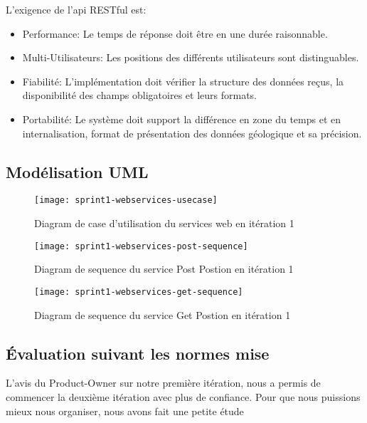 L'exigence de l'api RESTful est:
\begin{itemize}
    \item Performance: Le temps de réponse doit être en une durée raisonnable.
    \item Multi-Utilisateurs: Les positions des différents utilisateurs sont
        distinguables.
    \item Fiabilité: L'implémentation doit vérifier la structure des données
        reçus, la disponibilité des champs obligatoires et leurs formats.
    \item Portabilité: Le système doit support la différence en zone du temps
        et en internalisation, format de présentation des données géologique et
        sa précision.
\end{itemize}


\subsection{Modélisation UML}

\begin{figure}[htbp]
  \centering
  \texttt{[image: sprint1-webservices-usecase]}
  \caption{Diagram de case d'utilisation du services web en itération 1}
  \label{fig:sprint1-webservices-usecase}
\end{figure}

\begin{figure}[htbp]
  \centering
  \texttt{[image: sprint1-webservices-post-sequence]}
  \caption{Diagram de sequence du service Post Postion en itération 1}
  \label{fig:sprint1-webservices-post-sequence}
\end{figure}

\begin{figure}[htbp]
  \centering
  \texttt{[image: sprint1-webservices-get-sequence]}
  \caption{Diagram de sequence du service Get Postion en itération 1}
  \label{fig:sprint1-webservices-get-sequence}
\end{figure}

\subsection{Évaluation suivant les normes mise}
L’avis du Product-Owner sur notre première itération, nous a permis de commencer la
deuxième itération avec plus de confiance. Pour que nous puissions mieux nous
organiser, nous avons fait une petite étude

